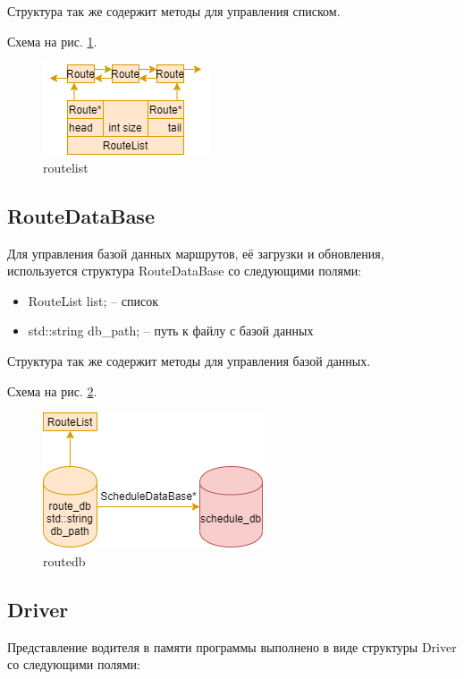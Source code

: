 Структура так же содержит методы для управления списком.

Схема на рис. \ref{route_list}.

\begin{figure}[hpt!]
    \centering
    \includegraphics[width=0.4\linewidth]{photo/route_list}
    \caption{routelist}
    \label{route_list}
\end{figure}

\subsection{RouteDataBase}

Для управления базой данных маршрутов, 
её загрузки и обновления, 
используется структура RouteDataBase со следующими полями: 

\begin{itemize}
    \item RouteList list{}; -- список
    \item std::string db\_path{}; -- путь к файлу с базой данных
\end{itemize}

Структура так же содержит методы для управления базой данных.

Схема на рис. \ref{route_db}.

\begin{figure}[hpt!]
    \centering
    \includegraphics[width=0.4\linewidth]{photo/route_db}
    \caption{routedb}
    \label{route_db}
\end{figure}

\subsection{Driver}

Представление водителя в памяти программы выполнено в виде структуры Driver со следующими полями:

